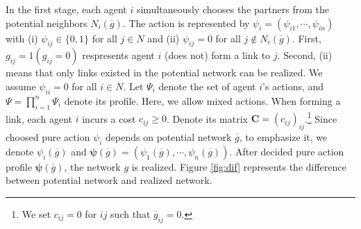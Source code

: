 \documentclass[12pt]{article}
\theoremstyle{definition}
\newcommand{\bm}[1]{\boldsymbol{#1}}
\begin{document}
In the first stage, each agent $i$ simultaneously chooses the partners from the potential neighbors $N_i(\overline{g})$.
The action is represented by $\psi_i = (\psi_{i1}, \cdots, \psi_{in})$ with (i) $\psi_{ij} \in \{0, 1\}$ for all $j \in N$ and (ii) $\psi_{ij} = 0$ for all $j \notin N_i(\overline{g})$.
First, $g_{ij} = 1(g_{ij} = 0)$ respresents agent $i$ (does not) form a link to $j$.
Second, (ii) means that only links existed in the potential network can be realized.
We assume $\psi_{ii}=0$ for all $i \in N$.
Let $\Psi_i$ denote the set of agent $i$'s actions, and $\Psi = \prod_{i=1}^n \Psi_i$ denote its profile.
Here, we allow mixed actions.
When forming a link, each agent $i$ incurs a cost $c_{ij} \ge 0$.
Denote its matrix $\bm{C} = {(c_{ij})}_{ij}$.\footnote{We set $c_{ij} = 0$ for $ij$ such that $\overline{g}_{ij} = 0$.}
Since choosed pure action $\psi_i$ depends on potential network $\overline{g}$, to emphasize it, we denote $\psi_i(\overline{g})$ and $\bm{\psi}(\overline{g}) = (\psi_1(\overline{g}), \cdots, \psi_n(\overline{g}))$.
After decided pure action profile $\bm{\psi}(\overline{g})$, the network $g$ is realized.
Figure \ref{fig:dif} represents the difference between potential network and realized network.
\end{document}

